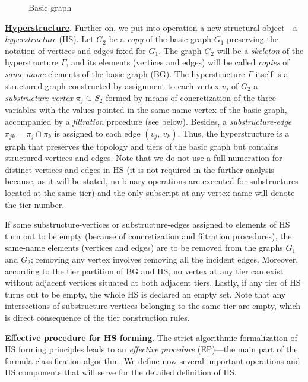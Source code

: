 \documentclass[12pt, a4paper]{article}
\begin{document}
\begin{figure}[h]
\begin{center}
\begin{tikzpicture}
\end{tikzpicture}
\end{center}
\caption{Basic graph}
\end{figure}

{\bf \underline {Hyperstructure}}.
 Further on, we put into operation a new structural object---a {\it  hyperstructure} (HS). Let $G_2$  be a {\it copy} of the basic graph $G_1$ preserving the notation of vertices and edges fixed for $G_1$. The graph  $G_2$   will be a {\it skeleton} of the hyperstructure  $\Gamma$, and its elements (vertices and edges) will be called {\it copies} of {\it same-name} elements of the basic graph (BG). The hyperstructure  $\Gamma$  itself is a structured graph constructed by assignment to each vertex  $v_j$  of  $G_2$  a {\it substructure-vertex} $\pi_j\subseteq S_2$ formed by means of concretization of the three variables with the values pointed in the same-name vertex of the basic graph, accompanied by a {\it filtration} procedure (see below). Besides, a {\it substructure-edge}  $\pi_{jk}=\pi_j \cap \pi_k$   is  assigned  to  each  edge $(v_j,\ v_k)$.  Thus, the hyperstructure is a graph that preserves the topology and tiers of the basic graph but contains structured vertices and edges. Note that we do not use a full numeration for distinct vertices and edges in HS (it is not required in the further analysis because, as it will be stated, no binary operations are executed for substructures located at the same tier) and the only subscript at any vertex name will denote the tier number.

If some substructure-vertices or substructure-edges assigned to elements of HS turn out to be empty (because of concretization and filtration procedures), the same-name elements (vertices and edges) are to be removed from the graphs $G_1$ and $G_2$; removing any vertex involves removing all the incident edges. Moreover, according to the tier partition of BG and HS, no vertex at any tier can exist without adjacent vertices situated at both adjacent tiers. Lastly, if any tier of HS turns out to be empty, the whole HS is declared an empty set. Note that any intersections of substructure-vertices belonging to the same tier are empty, which is direct consequence of the tier construction rules.

{\bf \underline {Effective procedure for HS forming}}.
 The strict algorithmic formalization of HS forming principles leads to an {\it effective procedure} (EP)---the main part of the formula classification algorithm. We define now several important operations and HS components that will serve for the detailed definition of HS.
\end{document}
